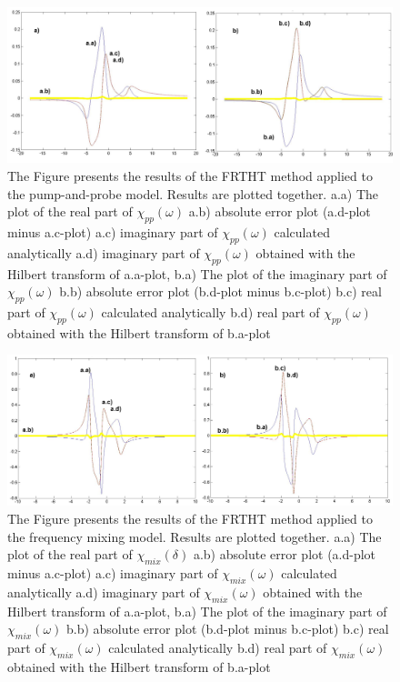 \documentclass[12pt,twoside,a4paper]{article}
\numberwithin{equation}{subsection}
\numberwithin{figure}{subsection}
\begin{document}
\begin{figure} 
  \includegraphics[width=150mm]{img/fht_pnp.png}
  \caption{The Figure presents the results of the FRTHT method applied to the pump-and-probe model. Results are plotted together.
     a.a) The plot of the real part of ${\chi_{pp}}(\omega )$
     a.b) absolute error plot (a.d-plot minus a.c-plot) 
     a.c) imaginary part of $\chi_{pp}(\omega )$ calculated analytically 
     a.d) imaginary part of $\chi_{pp}(\omega )$ obtained with the Hilbert transform of a.a-plot, 
     b.a) The plot of the imaginary part of $\chi_{pp}(\omega )$ 
     b.b) absolute error plot (b.d-plot minus b.c-plot) 
     b.c) real part of $\chi_{pp} (\omega )$ calculated analytically 
     b.d) real part of $\chi_{pp} (\omega )$ obtained with the Hilbert transform of b.a-plot 
     \label{fig:fht_pnp}
     }
\end{figure} 

\begin{figure} 
  \includegraphics[width=150mm]{img/fht_fmix.png}
  \caption{The Figure presents the results of the FRTHT method applied to the frequency mixing model. Results are plotted together.
     a.a) The plot of the real part of ${\chi_{mix}}(\delta )$
     a.b) absolute error plot (a.d-plot minus a.c-plot) 
     a.c) imaginary part of $\chi_{mix}(\omega )$ calculated analytically 
     a.d) imaginary part of $\chi_{mix}(\omega )$ obtained with the Hilbert transform of a.a-plot, 
     b.a) The plot of the imaginary part of $\chi_{mix}(\omega )$ 
     b.b) absolute error plot (b.d-plot minus b.c-plot) 
     b.c) real part of $\chi_{mix} (\omega )$ calculated analytically 
     b.d) real part of $\chi_{mix} (\omega )$ obtained with the Hilbert transform of b.a-plot 
     \label{fig:fht_fmix}
     }
\end{figure}
\end{document}
